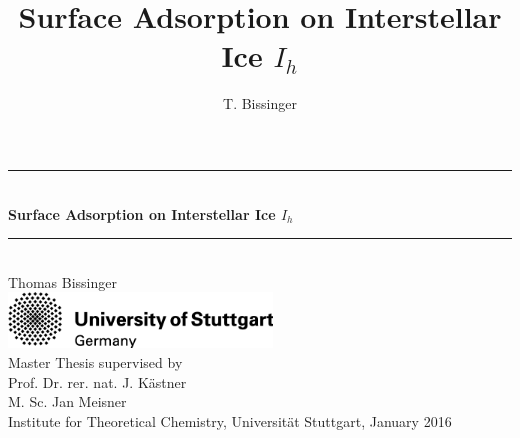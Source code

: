\documentclass[8.5pt,twoside,twocolumn]{article}
\title{Surface Adsorption on Interstellar Ice $I_h$}
\author{T. Bissinger}
\theoremstyle{standard}
\begin{document}
\begin{titlepage}

\begin{center}


 


\newcommand{\HRule}{\rule{\linewidth}{0.5mm}}

\HRule \\[0.4cm]

{ \huge \bfseries Surface Adsorption on Interstellar Ice $I_h$}


\HRule \\[2cm]

{\LARGE Thomas Bissinger}\\[4cm]

\vfill 
\includegraphics[width=7cm]{./img/unilogo_international.png}\\[2cm]   

{\Large Master Thesis supervised by \\[.7cm]
Prof. Dr. rer. nat. J. Kästner \\[.4cm]
M. Sc. Jan Meisner}\\[.4cm]


{ \Large  Institute for Theoretical Chemistry, Universität Stuttgart, January
2016}




\end{center}


\end{titlepage}
\newpage
\newpage
\clearpage
\end{document}

